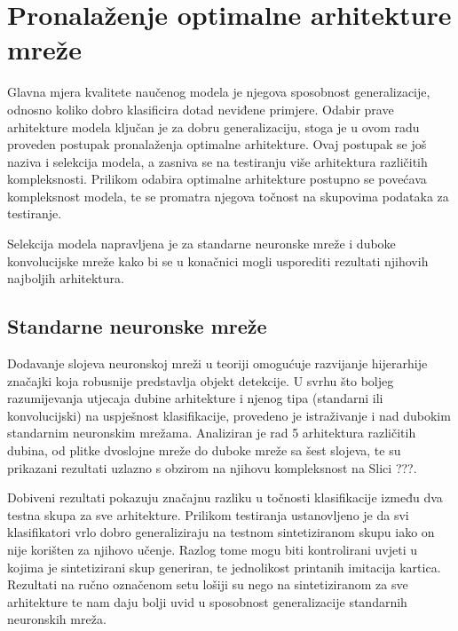 \documentclass[lmodern, utf8, diplomski, numeric]{fer}
\begin{document}
\section{Pronalaženje optimalne arhitekture mreže}

Glavna mjera kvalitete naučenog modela je njegova sposobnost generalizacije, odnosno koliko dobro klasificira dotad neviđene primjere. Odabir prave arhitekture modela ključan je za dobru generalizaciju, stoga je u ovom radu proveden postupak pronalaženja optimalne arhitekture. Ovaj postupak se još naziva i selekcija modela, a zasniva se na testiranju više arhitektura različitih kompleksnosti. Prilikom odabira optimalne arhitekture postupno se povećava kompleksnost modela, te se promatra njegova točnost na skupovima podataka za testiranje. 

Selekcija modela napravljena je za standarne neuronske mreže i duboke konvolucijske mreže kako bi se u konačnici mogli usporediti rezultati njihovih najboljih arhitektura.

\subsection{Standarne neuronske mreže}

Dodavanje slojeva neuronskoj mreži u teoriji omogućuje razvijanje hijerarhije značajki koja robusnije predstavlja objekt detekcije. U svrhu što boljeg razumijevanja utjecaja dubine arhitekture i njenog tipa (standarni ili konvolucijski) na uspješnost klasifikacije,  provedeno je istraživanje i nad dubokim standarnim neuronskim mrežama. Analiziran je rad 5 arhitektura različitih dubina, od plitke dvoslojne mreže do duboke mreže sa šest slojeva, te su prikazani rezultati uzlazno s obzirom na njihovu kompleksnost na Slici ???. 

\begin{figure}[ht!]
\begin{center}
    
    \caption{}
\end{center}
\end{figure}

Dobiveni rezultati pokazuju značajnu razliku u točnosti klasifikacije između dva testna skupa za sve arhitekture. Prilikom testiranja ustanovljeno je da svi klasifikatori vrlo dobro generaliziraju na testnom sintetiziranom skupu iako on nije korišten za njihovo učenje. Razlog tome mogu biti kontrolirani uvjeti u kojima je sintetizirani skup generiran, te jednolikost printanih imitacija kartica. Rezultati na ručno označenom setu lošiji su nego na sintetiziranom za sve arhitekture te nam daju bolji uvid u sposobnost generalizacije standarnih neuronskih mreža.
\end{document}
